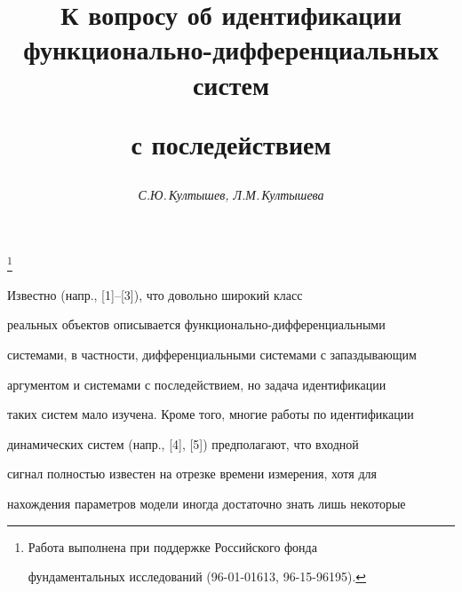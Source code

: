 



\author{\it С.Ю.\,Култышев, Л.М.\,Култышева}  




\title{К вопросу об идентификации \\ 


функционально-дифференциальных систем 


с последействием}  


  


\thanks{Работа выполнена при поддержке Российского фонда 


фундаментальных исследований (96-01-01613, 96-15-96195).}  


\date{}  




  


\pagestyle{plain} %


  


  




  


\maketitle  


\label{begin}





Известно (напр., [1]--[3]), что довольно широкий класс


реальных объектов описывается функционально-дифференциальными


системами, в частности, дифференциальными системами с запаздывающим


аргументом и системами с последействием, но задача идентификации


таких систем мало изучена. Кроме того, многие работы по идентификации


динамических систем (напр., [4], [5]) предполагают, что входной


сигнал полностью известен на отрезке времени измерения, хотя для


нахождения параметров модели иногда достаточно знать лишь некоторые



